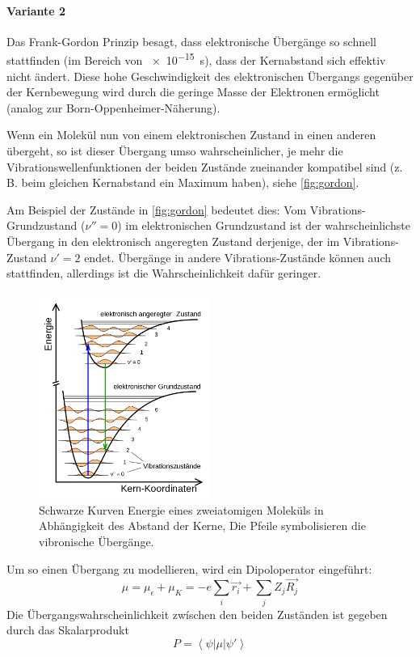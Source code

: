\paragraph{Variante 2}

Das Frank-Gordon Prinzip besagt, dass elektronische Übergänge so schnell stattfinden (im Bereich von \SI{e-15}{s}), dass der Kernabstand sich effektiv nicht ändert.
Diese hohe Geschwindigkeit des elektronischen Übergangs gegenüber der Kernbewegung wird durch die geringe Masse der Elektronen ermöglicht (analog zur Born-Oppenheimer-Näherung).

Wenn ein Molekül nun von einem elektronischen Zustand in einen anderen übergeht, so ist dieser Übergang umso wahrscheinlicher, je mehr die Vibrationswellenfunktionen der beiden Zustände zueinander kompatibel sind (z. B. beim gleichen Kernabstand ein Maximum haben), siehe \autoref{fig:gordon}.

Am Beispiel der Zustände in \autoref{fig:gordon} bedeutet dies: Vom Vibrations-Grundzustand ($\nu'' = 0$) im elektronischen Grundzustand ist der wahrscheinlichste Übergang in den elektronisch angeregten Zustand derjenige, der im Vibrations-Zustand $\nu' = 2$ endet. Übergänge in andere Vibrations-Zustände können auch stattfinden, allerdings ist die Wahrscheinlichkeit dafür geringer.


\begin{figure}[H]
    \centering
    \includegraphics[width = 0.5\textwidth]{resources/09-05-2012/Franck-Condon-Prinzip}
    \caption{Schwarze Kurven Energie eines zweiatomigen Moleküls in Abhängigkeit des Abstand der Kerne, Die Pfeile symbolisieren die vibronische Übergänge.}
    \label{fig:gordon}
\end{figure}


Um so einen Übergang zu modellieren, wird ein Dipoloperator eingeführt:
\begin{equation}
    \mu = \mu_{\epsilon} + \mu_K = - e \sum_{i} \vec{r_i}  + \sum_{j} Z_j \vec{R_j} 
\end{equation}
Die Übergangswahrscheinlichkeit zwíschen den beiden Zuständen ist gegeben durch das Skalarprodukt
\begin{equation}
    P = \left\langle\psi| \mu | \psi' \right\rangle   
\end{equation}

